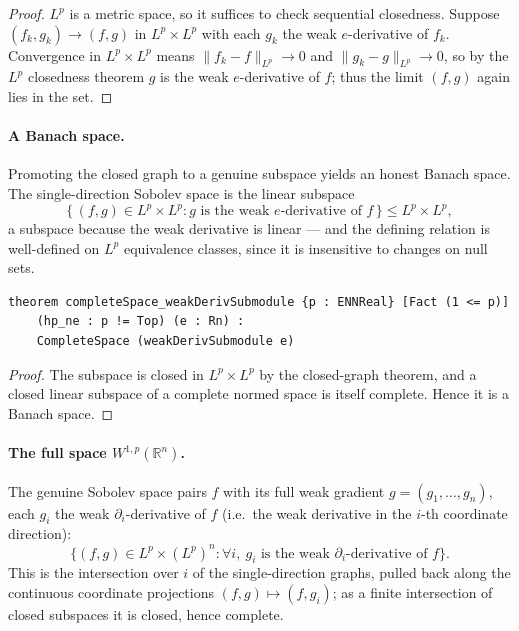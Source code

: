 ﻿\documentclass[12pt, a4paper]{article}
\renewcommand{\_}{\origunderscore\allowbreak}
\theoremstyle{definition}
\theoremstyle{plain}
\begin{document}
\begin{proof}
$L^p$ is a metric space, so it suffices to check sequential closedness. Suppose
$(f_k,g_k)\to(f,g)$ in $L^p\times L^p$ with each $g_k$ the weak $e$-derivative of $f_k$.
Convergence in $L^p\times L^p$ means $\|f_k-f\|_{L^p}\to0$ and $\|g_k-g\|_{L^p}\to0$, so by
the $L^p$ closedness theorem $g$ is the weak $e$-derivative of $f$; thus the limit
$(f,g)$ again lies in the set.
\end{proof}

\paragraph{A Banach space.}
Promoting the closed graph to a genuine subspace yields an honest Banach space. The
single-direction Sobolev space is the linear subspace
\[
  \{\,(f,g)\in L^p\times L^p : \text{$g$ is the weak $e$-derivative of $f$}\,\}
  \le L^p\times L^p,
\]
a subspace because the weak derivative is linear --- and the defining relation is
well-defined on $L^p$ equivalence classes, since it is insensitive to changes on null sets.

\begin{lstlisting}[caption={Single-direction Sobolev space is a Banach space (proved)}]
theorem completeSpace_weakDerivSubmodule {p : ENNReal} [Fact (1 <= p)]
    (hp_ne : p != Top) (e : Rn) :
    CompleteSpace (weakDerivSubmodule e)
\end{lstlisting}

\begin{proof}
The subspace is closed in $L^p\times L^p$ by the closed-graph theorem, and a closed linear
subspace of a complete normed space is itself complete. Hence it is a Banach space.
\end{proof}

\paragraph{The full space $W^{1,p}(\mathbb{R}^n)$.}
The genuine Sobolev space pairs $f$ with its full weak gradient $g=(g_1,\dots,g_n)$, each
$g_i$ the weak $\partial_i$-derivative of $f$ (i.e.\ the weak derivative in the $i$-th
coordinate direction):
\[
  \{(f,g)\in L^p\times (L^p)^n : \forall i,\ \text{$g_i$ is the weak
  $\partial_i$-derivative of $f$}\}.
\]
This is the intersection over $i$ of the single-direction graphs, pulled back along the
continuous coordinate projections $(f,g)\mapsto(f,g_i)$; as a finite intersection of closed
subspaces it is closed, hence complete.
\end{document}
